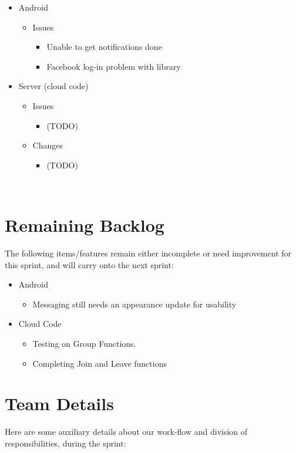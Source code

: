 \documentclass[11pt]{article}
\begin{document}
	\begin{itemize}
		\item Android
			\begin{itemize}
				\item Issues
				\begin{itemize}
					\item Unable to get notifications done
					\item Facebook log-in problem with library
				\end{itemize}
			\end{itemize}
			
		\item Server (cloud code)
		\begin{itemize}
				\item Issues
				\begin{itemize}
					\item (TODO)
				\end{itemize}
				
				\item Changes 
				\begin{itemize}
					\item (TODO)
				\end{itemize}
			\end{itemize}
	\end{itemize}
\\

\section*{Remaining Backlog}
The following items/features remain either incomplete or need improvement for this sprint, and will carry onto the next sprint:
	\begin{itemize}
		\item Android
		\begin{itemize}
			\item Messaging still needs an appearance update for usability
		\end{itemize}
		\item Cloud Code
		\begin{itemize}
			\item Testing on Group Functions.
			\item Completing Join and Leave functions
		\end{itemize}
	\end{itemize}


	
\section*{Team Details}
Here are some auxiliary details about our work-flow and division of responsibilities, during the sprint: \\\\
\end{document}
